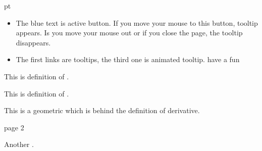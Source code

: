 \documentclass{article}
\begin{document}
 pt

\begin{itemize}
\item The blue text is active button. If you move your mouse to this button,
  tooltip appears. Is you move your mouse out or if you close the
  page, the tooltip disappears.
\item The first links are tooltips, the third one is animated tooltip.
  have a fun
\end{itemize}

  This is definition of  . 


  This is definition of . 

This is a geometric  which is behind the
definition of derivative.


\newpage
page 2 

Another .
\end{document}
